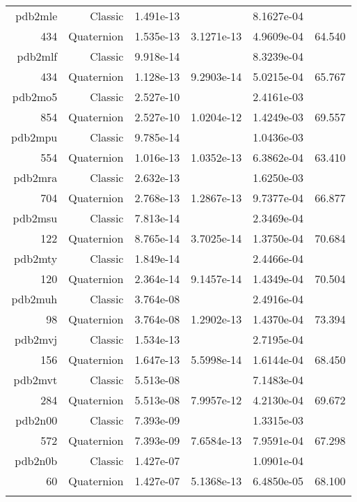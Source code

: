 \begin{xltabular}{\textwidth}{r|rS[table-format=1.3e+2]S[table-format=1.4e+2]S[table-format=1.4e+2]S[table-format=-1.3]}
pdb2mle & Classic & 1.491e-13 &  & 8.1627e-04 & \\
434 & Quaternion & 1.535e-13 & 3.1271e-13 & 4.9609e-04 & 64.540\\  \addlinespace
pdb2mlf & Classic & 9.918e-14 &  & 8.3239e-04 & \\
434 & Quaternion & 1.128e-13 & 9.2903e-14 & 5.0215e-04 & 65.767\\  \addlinespace
pdb2mo5 & Classic & 2.527e-10 &  & 2.4161e-03 & \\
854 & Quaternion & 2.527e-10 & 1.0204e-12 & 1.4249e-03 & 69.557\\  \addlinespace
pdb2mpu & Classic & 9.785e-14 &  & 1.0436e-03 & \\
554 & Quaternion & 1.016e-13 & 1.0352e-13 & 6.3862e-04 & 63.410\\  \addlinespace
pdb2mra & Classic & 2.632e-13 &  & 1.6250e-03 & \\
704 & Quaternion & 2.768e-13 & 1.2867e-13 & 9.7377e-04 & 66.877\\  \addlinespace
pdb2msu & Classic & 7.813e-14 &  & 2.3469e-04 & \\
122 & Quaternion & 8.765e-14 & 3.7025e-14 & 1.3750e-04 & 70.684\\  \addlinespace
pdb2mty & Classic & 1.849e-14 &  & 2.4466e-04 & \\
120 & Quaternion & 2.364e-14 & 9.1457e-14 & 1.4349e-04 & 70.504\\  \addlinespace
pdb2muh & Classic & 3.764e-08 &  & 2.4916e-04 & \\
98 & Quaternion & 3.764e-08 & 1.2902e-13 & 1.4370e-04 & 73.394\\  \addlinespace
pdb2mvj & Classic & 1.534e-13 &  & 2.7195e-04 & \\
156 & Quaternion & 1.647e-13 & 5.5998e-14 & 1.6144e-04 & 68.450\\  \addlinespace
pdb2mvt & Classic & 5.513e-08 &  & 7.1483e-04 & \\
284 & Quaternion & 5.513e-08 & 7.9957e-12 & 4.2130e-04 & 69.672\\  \addlinespace
pdb2n00 & Classic & 7.393e-09 &  & 1.3315e-03 & \\
572 & Quaternion & 7.393e-09 & 7.6584e-13 & 7.9591e-04 & 67.298\\  \addlinespace
pdb2n0b & Classic & 1.427e-07 &  & 1.0901e-04 & \\
60 & Quaternion & 1.427e-07 & 5.1368e-13 & 6.4850e-05 & 68.100\\  \addlinespace

\end{xltabular}
